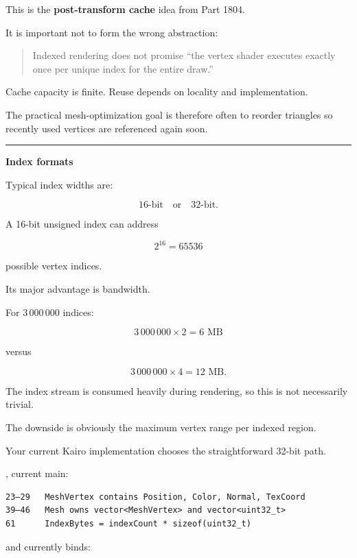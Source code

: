 This is the \textbf{post-transform cache} idea from Part 1804.

It is important not to form the wrong abstraction:

\begin{quote}
Indexed rendering does not promise ``the vertex shader executes exactly once per unique index for the entire draw.''
\end{quote}

Cache capacity is finite. Reuse depends on locality and implementation.

The practical mesh-optimization goal is therefore often to reorder triangles so recently used vertices are referenced again soon.

\begin{center}\rule{0.5\linewidth}{0.5pt}\end{center}

\textbf{Index formats}

Typical index widths are:

\[
16\text{-bit} \quad \text{or} \quad 32\text{-bit}.
\]

A 16-bit unsigned index can address

\[
2^{16}=65536
\]

possible vertex indices.

Its major advantage is bandwidth.

For \(3\,000\,000\) indices:

\[
3\,000\,000\times2 = 6\text{ MB}
\]

versus

\[
3\,000\,000\times4 = 12\text{ MB}.
\]

The index stream is consumed heavily during rendering, so this is not necessarily trivial.

The downside is obviously the maximum vertex range per indexed region.

Your current Kairo implementation chooses the straightforward 32-bit path.

, current main:

\begin{verbatim}
23–29   MeshVertex contains Position, Color, Normal, TexCoord
39–46   Mesh owns vector<MeshVertex> and vector<uint32_t>
61      IndexBytes = indexCount * sizeof(uint32_t)
\end{verbatim}

and  currently binds:

